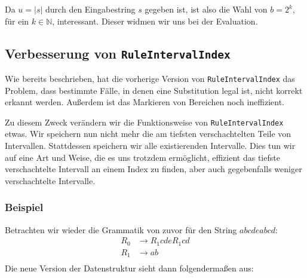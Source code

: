Da $u = |s|$ durch den Eingabestring $s$ gegeben ist, ist also die Wahl von $b = 2^k$, für ein $k \in \mathbb{N}$, interessant. Dieser widmen wir uns bei der Evaluation.

\subsection{Verbesserung von \texttt{RuleIntervalIndex}}

Wie bereits beschrieben, hat die vorherige Version von \texttt{RuleIntervalIndex} das Problem, dass bestimmte Fälle, in denen eine Substitution legal ist, nicht korrekt erkannt werden. Außerdem ist das Markieren von Bereichen noch ineffizient.  

Zu diesem Zweck verändern wir die Funktionsweise von \texttt{RuleIntervalIndex} etwas.
Wir speichern nun nicht mehr die am tiefsten verschachtelten Teile von Intervallen. Stattdessen speichern wir alle existierenden Intervalle. Dies tun wir auf eine Art und Weise, die es uns trotzdem ermöglicht, effizient das tiefste verschachtelte Intervall an einem Index zu finden, aber auch gegebenfalls weniger verschachtelte Intervalle. 

\subsubsection{Beispiel}

Betrachten wir wieder die Grammatik von zuvor für den String $abcdeabcd$:
\begin{align*}
	R_0 &\rightarrow R_1 c d e R_1 c d\\
	R_1 &\rightarrow a b\\
\end{align*}
Die neue Version der Datenstruktur sieht dann folgendermaßen aus:


